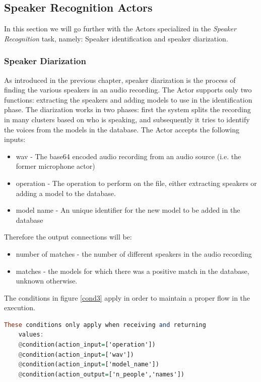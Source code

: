 \subsection{Speaker Recognition Actors}

In this section we will go further with the Actors specialized
in the \textit{Speaker Recognition} task, namely: Speaker identification
and speaker diarization.

\subsubsection{Speaker Diarization}

As introduced in the previous chapter, speaker diarization is the process of
finding the various speakers in an audio recording. The Actor supports only two
functions: extracting the speakers and adding models to use in the identification phase.
The diarization works in two phases: first the system splits the recording in many clusters
based on who is speaking, and subsequently it tries to identify the voices from the
models in the database.\newline
The Actor accepts the following inputs:
\begin{itemize}
    \item wav - The base64 encoded audio recording from an audio source (i.e. the former microphone actor)
    \item operation - The operation to perform on the file, either extracting speakers or adding a model to the database.
    \item model name - An unique identifier for the new model to be added in the database
\end{itemize}

Therefore the output connections will be:

\begin{itemize}
    \item number of matches - the number of different speakers in the audio recording
    \item matches - the models for which there was a positive match in the database, unknown otherwise.
\end{itemize}

The conditions in figure \ref{cond3} apply in order to maintain a proper flow in the execution.

\begin{lstlisting}[language=Haskell,frame=single,caption=Sound Actor conditions,label=cond3]
    These conditions only apply when receiving and returning
    values:
    @condition(action_input=['operation'])
    @condition(action_input=['wav'])
    @condition(action_input=['model_name'])
    @condition(action_output=['n_people','names'])

\end{lstlisting}

